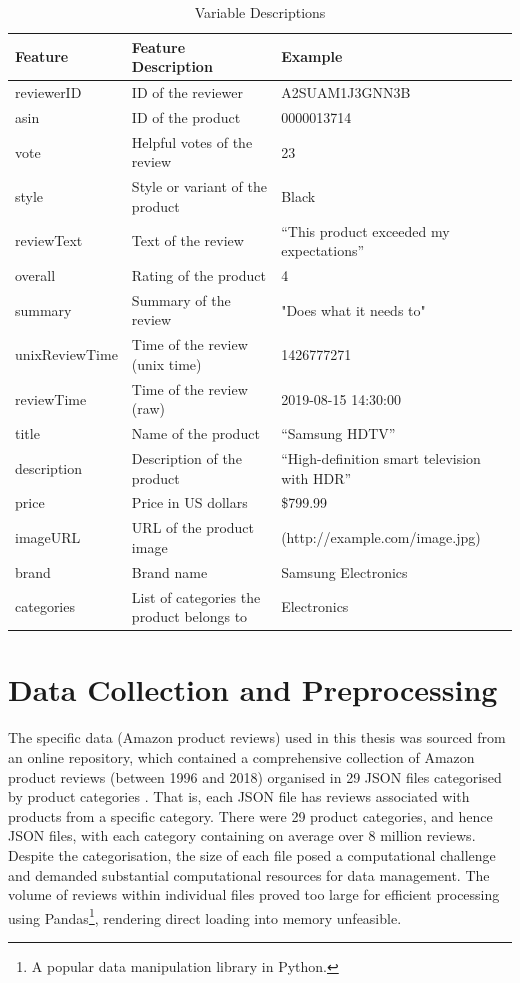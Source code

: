 \begin{table}[h]
  \centering
  \begin{tabular}{|p{3cm}|p{5cm}|p{6cm}|}
  \hline
  \textbf{Feature} & \textbf{Feature Description} & \textbf{Example} \\
  \hline
  reviewerID & ID of the reviewer & A2SUAM1J3GNN3B \\
  \hline
  asin & ID of the product & 0000013714 \\
  \hline
  vote & Helpful votes of the review & 23 \\
  \hline
  style & Style or variant of the product & Black \\
  \hline
  reviewText & Text of the review & “This product exceeded my expectations” \\
  \hline
  overall & Rating of the product & 4 \\
  \hline
  summary & Summary of the review & "Does what it needs to" \\
  \hline
  unixReviewTime & Time of the review (unix time) & 1426777271 \\
  \hline
  reviewTime & Time of the review (raw) & 2019-08-15 14:30:00 \\
  \hline
  title & Name of the product & “Samsung HDTV” \\
  \hline
  description & Description of the product & “High-definition smart television with HDR” \\
  \hline
  price & Price in US dollars & \$799.99 \\
  \hline
  imageURL & URL of the product image & (http://example.com/image.jpg) \\
  \hline
  brand & Brand name & Samsung Electronics \\
  \hline
  categories & List of categories the product belongs to & Electronics \\
  \hline
  \end{tabular}
  \caption{Variable Descriptions}
  \label{tab:variable_description}
  \end{table}
  
  
\section{Data Collection and Preprocessing}
\label{sec:3 Data Collection and Preprocessing}


The specific data (Amazon product reviews) used in this thesis was sourced from an online repository, which contained a comprehensive collection of Amazon product reviews (between 1996 and 2018) organised in 29 JSON files categorised by product categories \cite{pasricha2018translation}. That is, each JSON file has reviews associated with products from a specific category. There were 29 product categories, and hence JSON files, with each category containing on average over 8 million reviews. Despite the categorisation, the size of each file posed a computational challenge and demanded substantial computational resources for data management. The volume of reviews within individual files proved too large for efficient processing using Pandas\footnote{A popular data manipulation library in Python.}, rendering direct loading into memory unfeasible.

